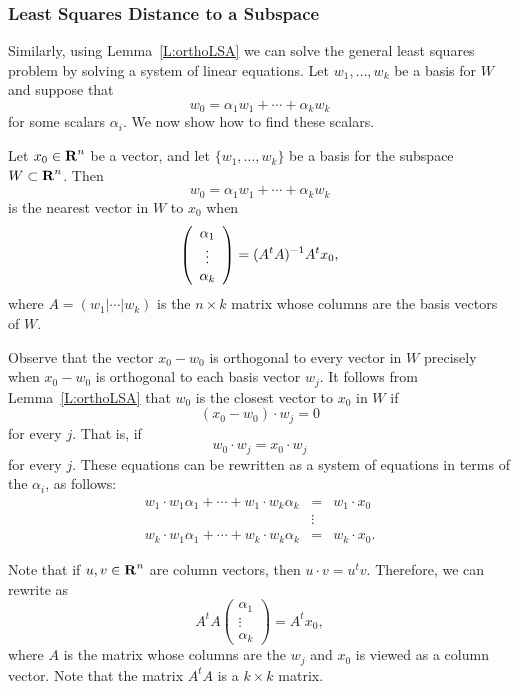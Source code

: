 \subsubsection*{Least Squares Distance to a Subspace}

Similarly, using Lemma~\ref{L:orthoLSA} we can solve the general least
squares problem by solving a system of linear equations.  Let
$w_1,\ldots,w_k$ be a basis for $W$ and suppose that
\[
w_0 = \alpha_1w_1 + \cdots + \alpha_kw_k
\]
for some scalars $\alpha_i$.  We now show how to find these scalars.

\begin{thm}  \label{T:nearestvector}
Let $x_0\in\mbox{$\bf{R}$}^n$ be a vector, and let $\{w_1,\ldots,w_k\}$ be a
basis for the subspace $W\subset\mbox{$\bf{R}$}^n$.
Then
\[
w_0 = \alpha_1w_1 + \cdots + \alpha_kw_k
\]
is the nearest vector in $W$ to $x_0$ when
\begin{equation}  \label{E:nearestvector}
\left(\begin{array}{c} \alpha_1 \\ \vdots \\ \alpha_k \end{array}\right) =
(A^tA)^{-1} A^tx_0,
\end{equation}
where $A=(w_1|\cdots|w_k)$ is the $n\times k$ matrix whose columns are the
basis vectors of $W$.
\end{thm}

\proof Observe that the vector $x_0-w_0$ is orthogonal to every vector in $W$
precisely when $x_0-w_0$ is orthogonal to each basis vector $w_j$.  It
follows from Lemma~\ref{L:orthoLSA} that $w_0$ is the closest vector to $x_0$
in $W$ if
\[
(x_0-w_0)\cdot w_j = 0
\]
for every $j$.  That is, if
\[
w_0\cdot w_j = x_0\cdot w_j
\]
for every $j$.  These equations can be rewritten as a system of equations in
terms of the $\alpha_i$, as follows:
\begin{equation}  \label{E:dots}
 \begin{array}{ccc}
w_1\cdot w_1\alpha_1 + \cdots + w_1\cdot w_k\alpha_k & = & w_1\cdot x_0\\
 & \vdots &  \\
w_k\cdot w_1\alpha_1 + \cdots + w_k\cdot w_k\alpha_k & = & w_k\cdot x_0.
\end{array}
\end{equation}

Note that if $u,v\in\mbox{$\bf{R}$}^n$ are column vectors, then $u\cdot v= u^tv$. Therefore,
we can rewrite  as
\[
A^tA \left(\begin{array}{c} \alpha_1\\ \vdots \\ \alpha_k \end{array}\right) =
A^tx_0,
\]
where $A$ is the matrix whose columns are the $w_j$ and $x_0$ is viewed as a
column vector.  Note that the matrix $A^tA$ is a $k\times k$ matrix.


